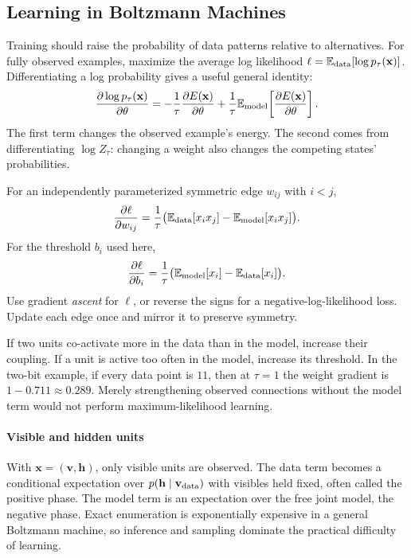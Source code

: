 \documentclass[11pt, oneside]{book}
\newcommand{\E}{\mathbb{E}}              %
\newcommand{\pd}[2]{\frac{\partial #1}{\partial #2}}
\let\originalsubsection\subsection
\renewcommand{\subsection}{\Needspace{6\baselineskip}\originalsubsection}
\begin{document}
\subsection{Learning in Boltzmann Machines}\label{sec:source-10-3-1}
Training should raise the probability of data patterns relative to alternatives. For fully observed examples, maximize the average log likelihood $\ell=\E_{\rm data}[\log p_\tau(\mathbf{x})]$. Differentiating a log probability gives a useful general identity:
\[
 \pd{\log p_\tau(\mathbf{x})}{\theta}
 =-\frac1\tau\pd{E(\mathbf{x})}{\theta}
 +\frac1\tau\E_{\rm model}\!\left[\pd{E(\mathbf{x})}{\theta}\right].
\]
The first term changes the observed example's energy. The second comes from differentiating $\log Z_\tau$: changing a weight also changes the competing states' probabilities.

\begin{thmbox}[title={Data statistics minus model statistics}]
For an independently parameterized symmetric edge $w_{ij}$ with $i<j$,
\[
 \pd{\ell}{w_{ij}}=\frac1\tau
 \bigl(\E_{\rm data}[x_ix_j]-\E_{\rm model}[x_ix_j]\bigr).
\]
For the threshold $b_i$ used here,
\[
 \pd{\ell}{b_i}=\frac1\tau
 \bigl(\E_{\rm model}[x_i]-\E_{\rm data}[x_i]\bigr).
\]
Use gradient \emph{ascent} for $\ell$, or reverse the signs for a negative-log-likelihood loss. Update each edge once and mirror it to preserve symmetry.
\end{thmbox}

If two units co-activate more in the data than in the model, increase their coupling. If a unit is active too often in the model, increase its threshold. In the two-bit example, if every data point is $11$, then at $\tau=1$ the weight gradient is $1-0.711\approx0.289$. Merely strengthening observed connections without the model term would not perform maximum-likelihood learning.

\paragraph{Visible and hidden units} With $\mathbf{x}=(\mathbf{v},\mathbf{h})$, only visible units are observed. The data term becomes a conditional expectation over $p(\mathbf{h}\mid\mathbf{v}_{\rm data})$ with visibles held fixed, often called the positive phase. The model term is an expectation over the free joint model, the negative phase. Exact enumeration is exponentially expensive in a general Boltzmann machine, so inference and sampling dominate the practical difficulty of learning.
\end{document}
